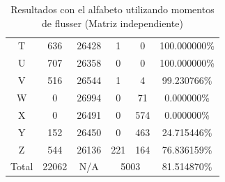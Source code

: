 \documentclass[a4paper, 11pt, oneside]{report}
\begin{document}
\begin{table}
\begin{tabular}{|c|c|c|c|c|c|}
T & 636 & 26428 & 1 & 0 & 100.000000\% \\ 
U & 707 & 26358 & 0 & 0 & 100.000000\% \\ 
V & 516 & 26544 & 1 & 4 & 99.230766\% \\ 
W & 0 & 26994 & 0 & 71 & 0.000000\% \\ 
X & 0 & 26491 & 0 & 574 & 0.000000\% \\ 
Y & 152 & 26450 & 0 & 463 & 24.715446\% \\ 
Z & 544 & 26136 & 221 & 164 & 76.836159\% \\ 
\hline
Total & 22062 & N/A & \multicolumn{2}{|c|}{5003} & 81.514870\% \\
\hline
\end{tabular}
\caption{Resultados con el alfabeto utilizando momentos de flusser (Matriz independiente)}
\label{tb:alphaFlIndep}
\end{table}
\end{document}
